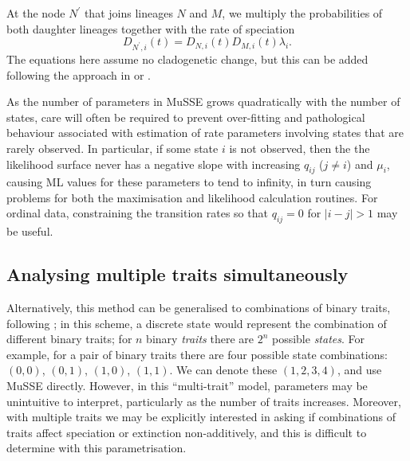 \documentclass[12pt]{article}
\begin{document}
At the node $N^\prime$ that joins lineages $N$ and $M$, we multiply
the probabilities of both daughter lineages together with the rate of
speciation
\begin{equation}
  D_{N^\prime,i}(t) = D_{N,i}(t) D_{M,i}(t) \lambda_i.
\end{equation}
The equations here assume no cladogenetic change, but this can be
added following the approach in \citet{Magnuson-Ford-2012} or
\citet{Goldberg-classe}.

As the number of parameters in MuSSE grows quadratically with the
number of states, care will often be required to prevent over-fitting
and pathological behaviour associated with estimation of rate
parameters involving states that are rarely observed.  
%
In particular, if some state $i$ is not observed, then the the
likelihood surface never has a negative slope with increasing $q_{ij}$
($j\neq i$) and $\mu_i$, causing ML values for these parameters to
tend to infinity, in turn causing problems for both the maximisation
and likelihood calculation routines.
%
For ordinal data, constraining the transition rates so that $q_{ij} =
0$ for $|i-j| > 1$ may be useful.

\subsection{Analysing multiple traits simultaneously}
Alternatively, this method can be generalised to combinations of
binary traits, following \citet{Pagel-1994-37}; in this scheme, a
discrete state would represent the combination of different binary
traits; for $n$ binary \textit{traits} there are $2^n$ possible
\textit{states}.
%
For example, for a pair of binary traits there are four possible state
combinations: $(0,0)$, $(0,1)$, $(1,0)$, $(1,1)$.  We can denote these
$(1, 2, 3, 4)$, and use MuSSE directly.
%
However, in this ``multi-trait'' model, parameters may be unintuitive
to interpret, particularly as the number of traits increases.
Moreover, with multiple traits we may be explicitly interested in
asking if combinations of traits affect speciation or extinction
non-additively, and this is difficult to determine with this
parametrisation.
\end{document}
